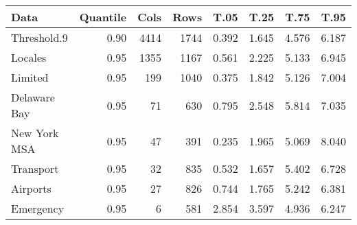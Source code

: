 \begin{tabular}{lrrrrrrr}
  \hline
Data & Quantile & Cols & Rows & T.05 & T.25 & T.75 & T.95 \\ 
  \hline
Threshold.9 & 0.90 & 4414 & 1744 & 0.392 & 1.645 & 4.576 & 6.187 \\ 
  Locales & 0.95 & 1355 & 1167 & 0.561 & 2.225 & 5.133 & 6.945 \\ 
  Limited & 0.95 & 199 & 1040 & 0.375 & 1.842 & 5.126 & 7.004 \\ 
  Delaware Bay & 0.95 & 71 & 630 & 0.795 & 2.548 & 5.814 & 7.035 \\ 
  New York MSA & 0.95 & 47 & 391 & 0.235 & 1.965 & 5.069 & 8.040 \\ 
  Transport & 0.95 & 32 & 835 & 0.532 & 1.657 & 5.402 & 6.728 \\ 
  Airports & 0.95 & 27 & 826 & 0.744 & 1.765 & 5.242 & 6.381 \\ 
  Emergency & 0.95 & 6 & 581 & 2.854 & 3.597 & 4.936 & 6.247 \\ 
   \hline
\end{tabular}
